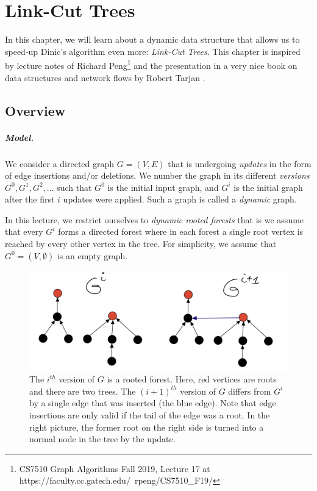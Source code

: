 \chapter{Link-Cut Trees}

In this chapter, we will learn about a dynamic data structure that allows us to speed-up Dinic's algorithm even more: \emph{Link-Cut Trees}. This chapter is inspired by lecture notes of Richard Peng\footnote{CS7510 Graph Algorithms Fall 2019, Lecture 17 at https://faculty.cc.gatech.edu/~rpeng/CS7510\_F19/} and the presentation in a very nice book on data structures and network flows by Robert Tarjan \cite{tarjan1983data}.

\section{Overview}

\paragraph{Model.} We consider a directed graph $G=(V,E)$ that is undergoing \emph{updates} in the form of edge insertions and/or deletions. We number the graph in its different \emph{versions} $G^0, G^1, G^2, \dots$ such that $G^0$ is the initial input graph, and $G^i$ is the initial graph after the first $i$ updates were applied. Such a graph is called a \emph{dynamic} graph.

In this lecture, we restrict ourselves to \emph{dynamic rooted forests} that is we assume that every $G^i$ forms a directed forest where in each forest a single root vertex is reached by every other vertex in the tree. For simplicity, we assume that $G^0 = (V, \emptyset)$ is an empty graph.

\begin{figure}[!ht]
    \centering
    \includegraphics[scale=0.2]{./fig/InsertionDynamicTree_lectureDynamicTree.jpeg}
    \caption{The $i^{th}$ version of $G$ is a rooted forest. Here, red vertices are roots and there are two trees. The $(i+1)^{th}$ version of $G$ differs from $G^i$ by a single edge that was inserted (the blue edge). Note that edge insertions are only valid if the tail of the edge was a root. In the right picture, the former root on the right side is turned into a normal node in the tree by the update.}
    \label{fig:my_label}
\end{figure}

